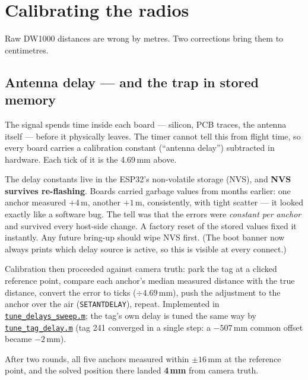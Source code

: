 \documentclass[11pt,a4paper]{article}
\newcommand{\gh}[2]{\href{https://github.com/AdershM-2/UWB_3/blob/main/#1}{\texttt{#2}}}
\newcommand{\code}[1]{\texttt{#1}}
\begin{document}
\section{Calibrating the radios}
\label{sec:calibration}

Raw DW1000 distances are wrong by metres. Two corrections bring them to centimetres.

\subsection{Antenna delay --- and the trap in stored memory}
\label{sec:delay}

The signal spends time inside each board --- silicon, PCB traces, the antenna
itself --- before it physically leaves. The timer cannot tell this from flight
time, so every board carries a calibration constant (``antenna delay'') subtracted
in hardware. Each tick of it is the 4.69\,mm above.

\begin{pitfall}
The delay constants live in the ESP32's non-volatile storage (NVS), and
\textbf{NVS survives re-flashing}. Boards carried garbage values from months
earlier: one anchor measured $+4$\,m, another $+1$\,m, consistently, with tight
scatter --- it looked exactly like a software bug. The tell was that the errors
were \emph{constant per anchor} and survived every host-side change. A factory
reset of the stored values fixed it instantly. Any future bring-up should wipe NVS
first. (The boot banner now always prints which delay source is active, so this is
visible at every connect.)
\end{pitfall}

Calibration then proceeded against camera truth: park the tag at a clicked
reference point, compare each anchor's median measured distance with the true
distance, convert the error to ticks ($\div 4.69$\,mm), push the adjustment to the
anchor over the air (\code{SETANTDELAY}), repeat. Implemented in
\gh{matlab/scripts/tune\_delays\_sweep.m}{tune\_delays\_sweep.m}; the tag's own
delay is tuned the same way by
\gh{matlab/scripts/tune\_tag\_delay.m}{tune\_tag\_delay.m} (tag 241 converged in a
single step: a $-507$\,mm common offset became $-2$\,mm).

\begin{result}
After two rounds, all five anchors measured within $\pm16$\,mm at the reference
point, and the solved position there landed \textbf{4\,mm} from camera truth.
\end{result}
\end{document}
